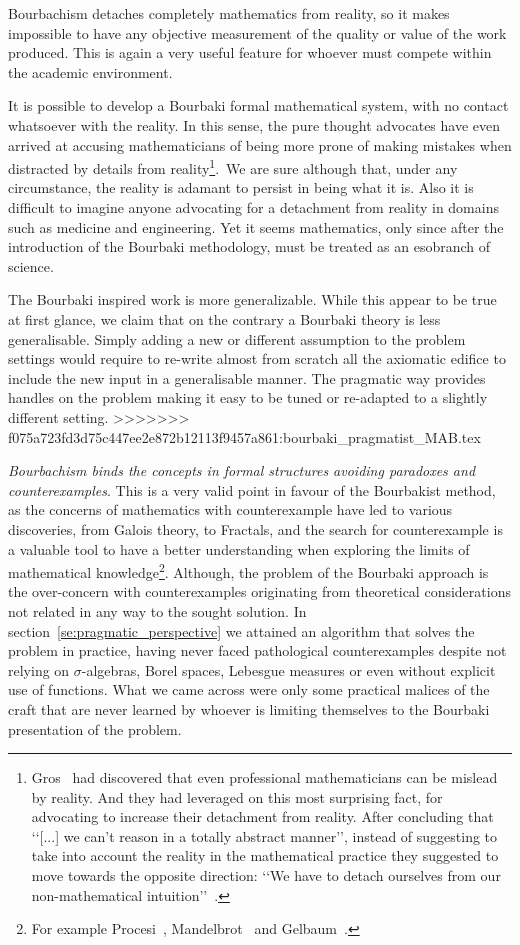 \documentclass[]{scrartcl}
\theoremstyle{definition}
\begin{document}
Bourbachism detaches completely mathematics from reality, so it makes impossible to have any objective measurement of the quality or value of the work produced. This is again a very useful feature for whoever must compete within the academic environment. 

It is possible to develop a Bourbaki formal mathematical system, with no contact whatsoever with the reality. In this sense, the pure thought advocates have even arrived at accusing mathematicians of being more prone of making mistakes when distracted by details from reality\footnote{
    Gros~\cite{gros2019masters} had discovered that even professional mathematicians can be mislead by reality. And they had leveraged on this most surprising fact, for advocating to increase their detachment from reality. After concluding that \lq\lq [...] we can't reason in a totally abstract manner\rq\rq, instead of suggesting to take into account the reality in the mathematical practice they suggested to move towards the opposite direction: \lq\lq We have to detach ourselves from our non-mathematical intuition\rq\rq~\cite{gros2019sciencedaily}.
}. We are sure although that, under any circumstance, the reality is adamant to persist in being what it is. Also it is difficult to imagine anyone advocating for a detachment from reality in domains such as medicine and engineering. Yet it seems mathematics, only since after the introduction of the Bourbaki methodology, must be treated as an esobranch of science.

The Bourbaki inspired work is more generalizable. While this appear to be true at first glance, we claim that on the contrary a Bourbaki theory is less generalisable. Simply adding a new or different assumption to the problem settings would require to re-write almost from scratch all the axiomatic edifice to include the new input in a generalisable manner. The pragmatic way provides handles on the problem making it easy to be tuned or re-adapted to a slightly different setting. 
>>>>>>> f075a723fd3d75c447ee2e872b12113f9457a861:bourbaki_pragmatist_MAB.tex

\emph{Bourbachism binds the concepts in formal structures avoiding paradoxes and counterexamples}. This is a very valid point in favour of the Bourbakist method, as the concerns of mathematics with counterexample have led to various discoveries, from Galois theory, to Fractals, and the search for counterexample is a valuable tool to have a better understanding when exploring the limits of mathematical knowledge\footnote{
    For example Procesi~\cite{procesi1977elementi}, Mandelbrot~\cite{mandelbrot1983fractal} and Gelbaum~\cite{gelbaum2003counterexamples}.
}. Although, the problem of the Bourbaki approach is the over-concern with counterexamples originating from theoretical considerations not related in any way to the sought solution. In section~\ref{se:pragmatic_perspective} we attained an algorithm that solves the problem in practice, having never faced pathological counterexamples despite not relying on $\sigma$-algebras, Borel spaces, Lebesgue measures or even without explicit use of functions. What we came across were only some practical malices of the craft that are never learned by whoever is limiting themselves to the Bourbaki presentation of the problem.
\end{document}
